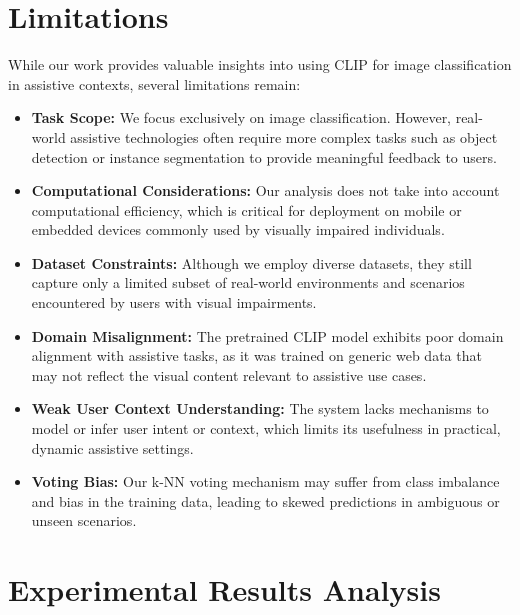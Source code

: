 \documentclass[9pt,a4paper,twocolumn,twoside]{tau-class/tau}
\begin{document}
\section{Limitations}

While our work provides valuable insights into using CLIP for image classification in assistive contexts, several limitations remain:

\begin{itemize}
    \item \textbf{Task Scope:} We focus exclusively on image classification. However, real-world assistive technologies often require more complex tasks such as object detection or instance segmentation to provide meaningful feedback to users.

    \item \textbf{Computational Considerations:} Our analysis does not take into account computational efficiency, which is critical for deployment on mobile or embedded devices commonly used by visually impaired individuals.

    \item \textbf{Dataset Constraints:} Although we employ diverse datasets, they still capture only a limited subset of real-world environments and scenarios encountered by users with visual impairments.

    \item \textbf{Domain Misalignment:} The pretrained CLIP model exhibits poor domain alignment with assistive tasks, as it was trained on generic web data that may not reflect the visual content relevant to assistive use cases.

    \item \textbf{Weak User Context Understanding:} The system lacks mechanisms to model or infer user intent or context, which limits its usefulness in practical, dynamic assistive settings.

    \item \textbf{Voting Bias:} Our k-NN voting mechanism may suffer from class imbalance and bias in the training data, leading to skewed predictions in ambiguous or unseen scenarios.
\end{itemize}


\section{Experimental Results Analysis}
\end{document}
